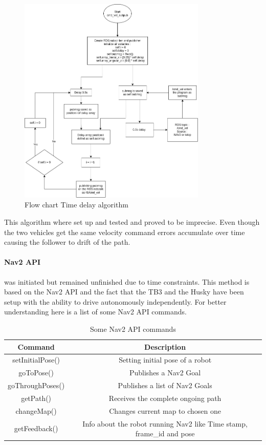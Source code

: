 \begin{figure}[H]
    \centering
    \includegraphics[width = 0.8\textwidth]{Figures/drawio/cmd_vel_subpub.png}
    \caption{Flow chart Time delay algorithm}
    \label{fig:TimeDelayFlow}
\end{figure}

This algorithm where set up and tested and proved to be imprecise. Even though the two vehicles get the same velocity command errors accumulate over time causing the follower to drift of the path. 

\paragraph{Nav2 API} was initiated but remained unfinished due to time constraints. This method is based on the Nav2 API and the fact that the TB3 and the Husky have been setup with the ability to drive autonomously independently. For better understanding here is a list of some Nav2 API commands.

\begin{table}[H]
    \centering
    \begin{tabular}{c|c}
        Command             & Description \\ \hline
        setInitialPose()    & Setting initial pose of a robot \\
        goToPose()          & Publishes a Nav2 Goal \\
        goThroughPoses()    & Publishes a list of Nav2 Goals \\
        getPath()           & Receives the complete ongoing path \\
        changeMap()         & Changes current map to chosen one \\
        getFeedback() & Info about the robot running Nav2 like Time stamp, frame\_id and pose\\
    \end{tabular}
    \caption{Some Nav2 API commands\cite{rosnavAPI}}
    \label{tab:Nav2API}
\end{table}


